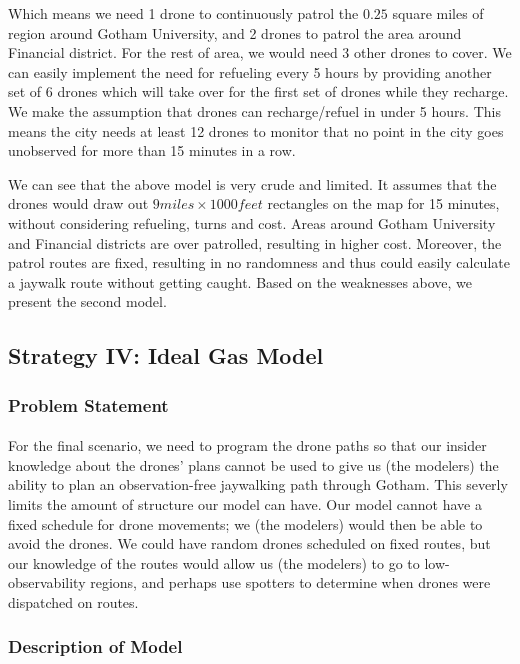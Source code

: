 \documentclass{article}
\begin{document}
Which means we need 1 drone to continuously patrol the $0.25$ square miles of region around Gotham University, and 2 drones to patrol the area around Financial district. For the rest of area, we would need 3 other drones to cover. We can easily implement the need for refueling every 5 hours by providing another set of 6 drones which will take over for the first set of drones while they recharge. We make the assumption that drones can recharge/refuel in under 5 hours. This means the city needs at least 12 drones to monitor that no point in the city goes unobserved for more than 15 minutes in a row. 

We can see that the above model is very crude and limited. It assumes that the drones would draw out $9 miles \times 1000 feet $ rectangles on the map for 15 minutes, without considering refueling, turns and cost. Areas around Gotham University and Financial districts are over patrolled, resulting in higher cost. Moreover, the patrol routes are fixed, resulting in no randomness and thus could easily calculate a jaywalk route without getting caught. Based on the weaknesses above, we present the second model.

\subsection{Strategy IV: Ideal Gas Model}

\subsubsection{Problem Statement}

\paragraph{}
For the final scenario, we need to program the drone paths so that our insider
	knowledge about the drones' plans cannot be used to give us (the modelers)
	the ability to plan an observation-free jaywalking path through Gotham.
This severly limits the amount of structure our model can have.
Our model cannot have a fixed schedule for drone movements;
	we (the modelers) would then be able to avoid the drones.
We could have random drones scheduled on fixed routes, but our knowledge of the
	routes would allow us (the modelers) to go to low-observability regions,
	and perhaps use spotters to determine when drones were dispatched on routes.

\subsubsection{Description of Model}
\end{document}
